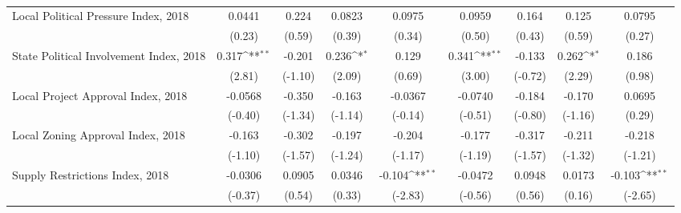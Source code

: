 \begin{table}[htbp]\centering
\def\sym#1{\ifmmode^{#1}\else\(^{#1}\)\fi}
\caption{ \label{tab1}}
\begin{tabular}{l*{8}{c}}
\toprule
\midrule
Local Political Pressure Index, 2018&      0.0441         &       0.224         &      0.0823         &      0.0975         &      0.0959         &       0.164         &       0.125         &      0.0795         \\
                    &      (0.23)         &      (0.59)         &      (0.39)         &      (0.34)         &      (0.50)         &      (0.43)         &      (0.59)         &      (0.27)         \\
\addlinespace
State Political Involvement Index, 2018&       0.317\sym{**} &      -0.201         &       0.236\sym{*}  &       0.129         &       0.341\sym{**} &      -0.133         &       0.262\sym{*}  &       0.186         \\
                    &      (2.81)         &     (-1.10)         &      (2.09)         &      (0.69)         &      (3.00)         &     (-0.72)         &      (2.29)         &      (0.98)         \\
\addlinespace
Local Project Approval Index, 2018&     -0.0568         &      -0.350         &      -0.163         &     -0.0367         &     -0.0740         &      -0.184         &      -0.170         &      0.0695         \\
                    &     (-0.40)         &     (-1.34)         &     (-1.14)         &     (-0.14)         &     (-0.51)         &     (-0.80)         &     (-1.16)         &      (0.29)         \\
\addlinespace
Local Zoning Approval Index, 2018&      -0.163         &      -0.302         &      -0.197         &      -0.204         &      -0.177         &      -0.317         &      -0.211         &      -0.218         \\
                    &     (-1.10)         &     (-1.57)         &     (-1.24)         &     (-1.17)         &     (-1.19)         &     (-1.57)         &     (-1.32)         &     (-1.21)         \\
\addlinespace
Supply Restrictions Index, 2018&     -0.0306         &      0.0905         &      0.0346         &      -0.104\sym{**} &     -0.0472         &      0.0948         &      0.0173         &      -0.103\sym{**} \\
                    &     (-0.37)         &      (0.54)         &      (0.33)         &     (-2.83)         &     (-0.56)         &      (0.56)         &      (0.16)         &     (-2.65)         \\

\end{tabular}
\end{table}
